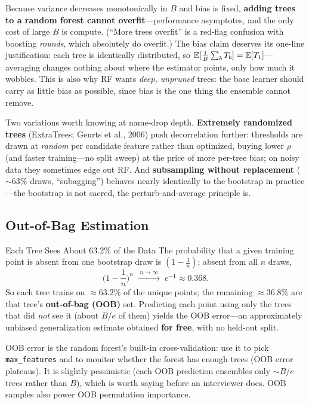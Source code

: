 Because variance decreases monotonically in $B$ and bias is fixed, \textbf{adding trees to a random forest cannot overfit}---performance asymptotes, and the only cost of large $B$ is compute. (``More trees overfit'' is a red-flag confusion with boosting \textit{rounds}, which absolutely do overfit.) The bias claim deserves its one-line justification: each tree is identically distributed, so $\operatorname{\mathbb{E}}[\frac{1}{B}\sum_b T_b] = \operatorname{\mathbb{E}}[T_1]$---averaging changes nothing about where the estimator points, only how much it wobbles. This is also why RF wants \textit{deep, unpruned} trees: the base learner should carry as little bias as possible, since bias is the one thing the ensemble cannot remove.

Two variations worth knowing at name-drop depth. \textbf{Extremely randomized trees} (ExtraTrees; Geurts et al., 2006) push decorrelation further: thresholds are drawn at \textit{random} per candidate feature rather than optimized, buying lower $\rho$ (and faster training---no split sweep) at the price of more per-tree bias; on noisy data they sometimes edge out RF. And \textbf{subsampling without replacement} ($\sim$63\% draws, ``subagging'') behaves nearly identically to the bootstrap in practice---the bootstrap is not sacred, the perturb-and-average principle is.

\subsection{Out-of-Bag Estimation}

\begin{mathresult}{Each Tree Sees About 63.2\% of the Data}
The probability that a given training point is absent from one bootstrap draw is $(1 - \tfrac{1}{n})$; absent from all $n$ draws,
\begin{equation}
\Big(1 - \frac{1}{n}\Big)^n \;\xrightarrow{\;n \to \infty\;}\; e^{-1} \approx 0.368.
\end{equation}
So each tree trains on $\approx 63.2\%$ of the unique points; the remaining $\approx 36.8\%$ are that tree's \textbf{out-of-bag (OOB)} set. Predicting each point using only the trees that did \textit{not} see it (about $B/e$ of them) yields the OOB error---an approximately unbiased generalization estimate obtained \textbf{for free}, with no held-out split.
\end{mathresult}

OOB error is the random forest's built-in cross-validation: use it to pick \texttt{max\_features} and to monitor whether the forest has enough trees (OOB error plateaus). It is slightly pessimistic (each OOB prediction ensembles only $\sim B/e$ trees rather than $B$), which is worth saying before an interviewer does. OOB samples also power OOB permutation importance.

